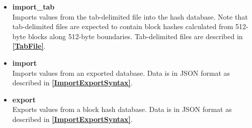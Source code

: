 \documentclass[11pt,fleqn]{article} %
\begin{document}
\begin{itemize}
\item \textbf{import\_tab}\\
Imports values from the tab-delimited file into the hash database. Note that tab-delimited files are expected to contain block hashes calculated from 512-byte blocks along 512-byte boundaries. Tab-delimited files are described in \textbf{\autoref{TabFile}}.
\item \textbf{import}\\
Imports values from an exported database. Data is in JSON format as described in \textbf{\autoref{ImportExportSyntax}}.
\item \textbf{export}\\
Exports values from a \hdb block hash database. Data is in JSON format as described in \textbf{\autoref{ImportExportSyntax}}.
\end{itemize}
\end{document}
